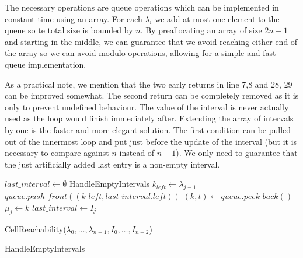 The necessary operations are queue operations which can be implemented in constant time using an array. For each \(\lambda_i\) we add at most one element to the queue so te total size is bounded by \(n\). By preallocating an array of size \(2n - 1\) and starting in the middle, we can guarantee that we avoid reaching either end of the array so we can avoid modulo operations, allowing for a simple and fast queue implementation.

As a practical note, we mention that the two early returns in line 7,8 and 28, 29 can be improved somewhat. The second return can be completely removed as it is only to prevent undefined behaviour. The value of the interval is never actually used as the loop would finish immediately after. Extending the array of intervals by one is the faster and more elegant solution. The first condition can be pulled out of the innermost loop and put just before the update of the interval (but it is necessary to compare against \(n\) instead of \(n-1\)). We only need to guarantee that the just artificially added last entry is a non-empty interval. 

\begin{algorithm}[htb]
  \DontPrintSemicolon
  \BlankLine
	\(last\_interval \gets \emptyset\) \;
	 {
		HandleEmptyIntervals\;
		\(k_{left} \gets \lambda_{j-1}\)\;
		\(queue.push\_front((k\_left, last\_interval.left))\) \;
		\((k, t) \gets queue.peek\_back()\) \;
		\(\mu_j \gets k\) \;
		\(last\_interval \gets I_j\)
	}
	\caption{CellReachability(\(\lambda_0, \dots, \lambda_{n-1}, I_0, \dots, I_{n-2}\))}
  \label{algo:cell_reachability}
\end{algorithm}

\begin{algorithm}[htb]
  \DontPrintSemicolon
  \BlankLine
	\caption{HandleEmptyIntervals}
  \label{algo:cell_reachability_empty}
\end{algorithm}



